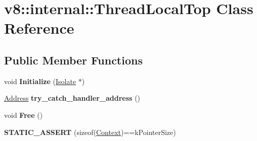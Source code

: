 \hypertarget{classv8_1_1internal_1_1ThreadLocalTop}{}\section{v8\+:\+:internal\+:\+:Thread\+Local\+Top Class Reference}
\label{classv8_1_1internal_1_1ThreadLocalTop}
\subsection*{Public Member Functions}
\begin{DoxyCompactItemize}
\item 
\mbox{\label{classv8_1_1internal_1_1ThreadLocalTop_a11f16bfd5074dfadf5b2fea9f7580404}} 
void {\bfseries Initialize} (\mbox{\hyperlink{classv8_1_1internal_1_1Isolate}{Isolate}} $\ast$)
\item 
\mbox{\label{classv8_1_1internal_1_1ThreadLocalTop_a80a0c4f75ef4db4765621ab43a0fb2ec}} 
\mbox{\hyperlink{classuintptr__t}{Address}} {\bfseries try\+\_\+catch\+\_\+handler\+\_\+address} ()
\item 
\mbox{\label{classv8_1_1internal_1_1ThreadLocalTop_a6eaa04c701660ff270c73f0c02250afd}} 
void {\bfseries Free} ()
\item 
\mbox{\label{classv8_1_1internal_1_1ThreadLocalTop_a4c483a4ed1926b6451c9f8235386c247}} 
{\bfseries S\+T\+A\+T\+I\+C\+\_\+\+A\+S\+S\+E\+RT} (sizeof(\mbox{\hyperlink{classv8_1_1internal_1_1Context}{Context}})==k\+Pointer\+Size)
\end{DoxyCompactItemize}
